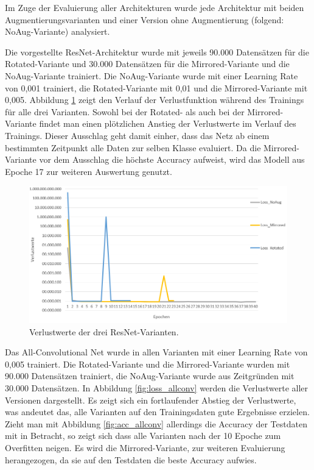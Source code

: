 Im Zuge der Evaluierung aller Architekturen wurde jede Architektur mit beiden Augmentierungsvarianten und einer Version ohne Augmentierung (folgend: NoAug-Variante) analysiert. 

Die vorgestellte ResNet-Architektur wurde mit jeweils 90.000 Datensätzen für die Rotated-Variante und 30.000 Datensätzen für die Mirrored-Variante und die NoAug-Variante trainiert. Die NoAug-Variante wurde mit einer Learning Rate von 0,001 trainiert, die Rotated-Variante mit 0,01 und die Mirrored-Variante mit 0,005. Abbildung \ref{fig:resnet_loss} zeigt den Verlauf der Verlustfunktion während des Trainings für alle drei Varianten. Sowohl bei der Rotated- als auch bei der Mirrored-Variante findet man einen plötzlichen Anstieg der Verlustwerte im Verlauf des Trainings. Dieser Ausschlag geht damit einher, dass das Netz ab einem bestimmten Zeitpunkt alle Daten zur selben Klasse evaluiert. Da die Mirrored-Variante vor dem Ausschlag die höchste Accuracy aufweist, wird das Modell aus Epoche 17 zur weiteren Auswertung genutzt.

\begin{figure}[H]
\centering
\includegraphics[scale=0.5]{pictures/Auswertung/resnet_loss}

\caption{Verlustwerte der drei ResNet-Varianten.}
\label{fig:resnet_loss}
\end{figure}

Das All-Convolutional Net wurde in allen Varianten mit einer Learning Rate von 0,005 trainiert. Die Rotated-Variante und die Mirrored-Variante wurden mit 90.000 Datensätzen trainiert, die NoAug-Variante wurde aus Zeitgründen mit 30.000 Datensätzen. In Abbildung \ref{fig:loss_allconv} werden die Verlustwerte aller Versionen dargestellt. Es zeigt sich ein fortlaufender Abstieg der Verlustwerte, was andeutet das, alle Varianten auf den Trainingsdaten gute Ergebnisse erzielen. Zieht man mit Abbildung \ref{fig:acc_allconv} allerdings die Accuracy der Testdaten mit in Betracht, so zeigt sich dass alle Varianten nach der 10 Epoche zum Overfitten neigen. Es wird die Mirrored-Variante, zur weiteren Evaluierung herangezogen, da sie auf den Testdaten die beste Accuracy aufwies. 


